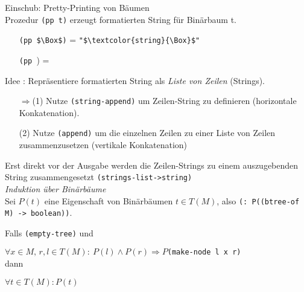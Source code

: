 Einschub: Pretty-Printing von Bäumen\\
Prozedur \lstinline|(pp t)| erzeugt formatierten String für Binärbaum t.
\begin{enumerate}
\item[] \lstinline[mathescape]|(pp $\Box$)| = \lstinline[mathescape]|"$\textcolor{string}{\Box}$"|
\item[] \lstinline|(pp |) = \begin{minipage}{0.5\textwidth}
\begin{tikzpicture}

\end{tikzpicture}
\end{minipage}
\end{enumerate}
Idee : Repräsentiere formatierten String als \emph{Liste von Zeilen} (Strings).
\begin{enumerate}[(1)]
\item[$\Rightarrow$(1)] Nutze \lstinline|(string-append)| um Zeilen-String zu definieren (horizontale Konkatenation).
\item[(2)] Nutze \lstinline|(append)| um die einzelnen Zeilen zu einer Liste von Zeilen zusammenzusetzen (vertikale Konkatenation)
\end{enumerate}
Erst direkt vor der Ausgabe werden die Zeilen-Strings zu einem auszugebenden String zusammengesetzt \lstinline|(strings-list->string)|\\
\emph{Induktion über Binärbäume}\\
Sei $P(t)$ eine Eigenschaft von Binärbäumen $t \in T(M)$, also \lstinline|(: P((btree-of M) -> boolean))|.
\begin{mdframed}
Falls \lstinline|(empty-tree)| 
und
\par $\forall x \in M,\,r,l\in T(M):\:P(l) \land P(r) \Rightarrow P$\lstinline|(make-node l x r)|\\
 dann
\par $\forall t \in T(M) : P(t)$
\end{mdframed}
